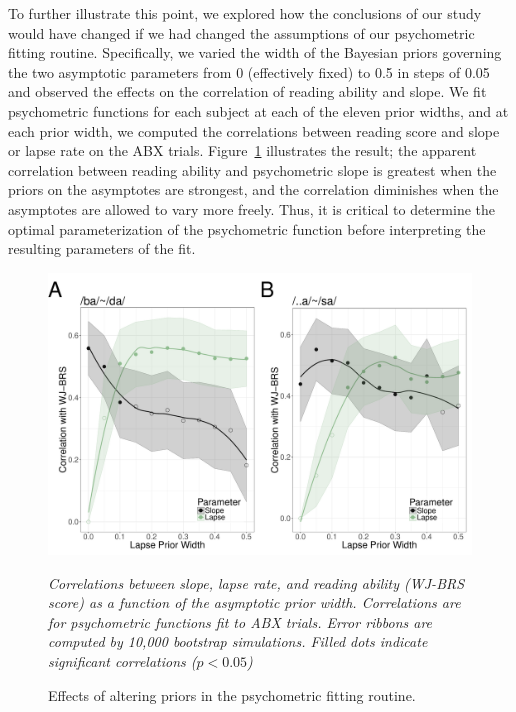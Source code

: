 \documentclass[../uwthesis.tex]{subfiles}
\begin{document}
To further illustrate this point, we explored how the conclusions of our study would have changed if we had changed the assumptions of our psychometric fitting routine. Specifically, we varied the width of the Bayesian priors governing the two asymptotic parameters from 0 (effectively fixed) to 0.5 in steps of 0.05 and observed the effects on the correlation of reading ability and slope. We fit psychometric functions for each subject at each of the eleven prior widths, and at each prior width, we computed the correlations between reading score and slope or lapse rate on the ABX trials. Figure~\ref{fig:g} illustrates the result; the apparent correlation between reading ability and psychometric slope is greatest when the priors on the asymptotes are strongest, and the correlation diminishes when the asymptotes are allowed to vary more freely. Thus, it is critical to determine the optimal parameterization of the psychometric function before interpreting the resulting parameters of the fit.
\begin{figure}
    \centering
    \caption{Effects of altering priors in the psychometric fitting routine.}
    \label{fig:g}
    \includegraphics[width = 18 cm]{images/paper_1/figure_correlation_wrt_prior.pdf}
    \item \textit{Correlations between slope, lapse rate, and reading ability (WJ-BRS score) as a function of the asymptotic prior width. Correlations are for psychometric functions fit to ABX trials. Error ribbons are computed by 10,000 bootstrap simulations. Filled dots indicate significant correlations ($p < 0.05$)}
\end{figure}
\end{document}
